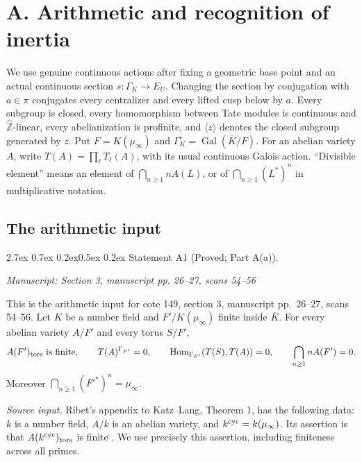 \documentclass[11pt,a4paper]{article}
\makeatletter
\newcommand{\passage}[1]{\par\smallskip\noindent\textit{Manuscript: #1}\par\smallskip}
\renewcommand\paragraph{\@startsection{paragraph}{4}{\z@}%
  {2.7ex \@plus 0.7ex \@minus 0.2ex}{0.5ex \@plus 0.2ex}%
  {\normalfont\normalsize\bfseries}}
\makeatother
\begin{document}
\section{A. Arithmetic and recognition of inertia}


We use genuine continuous actions after fixing a geometric base point and an actual continuous section $s:\Gamma_K\to E_U$. Changing the section by conjugation with $a\in\pi$ conjugates every centralizer and every lifted cusp below by $a$. Every subgroup is closed, every homomorphism between Tate modules is continuous and $\widehat{\mathbb Z}$-linear, every abelianization is profinite, and $\langle z\rangle$ denotes the closed subgroup generated by $z$. Put $F=K(\mu_\infty)$ and $\Gamma_K^\circ=\operatorname{Gal}(\overline K/F)$. For an abelian variety $A$, write $T(A)=\prod_\ell T_\ell(A)$, with its usual continuous Galois action. ``Divisible element'' means an element of $\bigcap_{n\geq1}nA(L)$, or of $\bigcap_{n\geq1}(L^*)^n$ in multiplicative notation.

\subsection{The arithmetic input}
\paragraph{Statement A1 (Proved; Part A(a)).}\label{res:A1}
\passage{Section 3, manuscript pp. 26–27, scans 54–56}

This is the arithmetic input for cote 149, section 3, manuscript pp.~26--27, scans 54--56.
Let $K$ be a number field and $F'/K(\mu_\infty)$ finite inside $\overline K$. For every abelian variety $A/F'$ and every torus $S/F'$,
\[
 A(F')_{\rm tors}\text{ is finite},\qquad T(A)^{\Gamma_{F'}}=0,
 \qquad\operatorname{Hom}_{\Gamma_{F'}}(T(S),T(A))=0,
 \qquad\bigcap_{n\geq1}nA(F')=0.
\]
Moreover $\bigcap_{n\geq1}(F'^*)^n=\mu_\infty$.

\emph{Source input.} Ribet's appendix to Katz--Lang, Theorem 1, has the following data: $k$ is a number field, $A/k$ is an abelian variety, and $k^{\rm cyc}=k(\mu_\infty)$. Its assertion is that $A(k^{\rm cyc})_{\rm tors}$ is finite \cite[Appendix, Theorem 1, p.~315]{Ribet1981}. We use precisely this assertion, including finiteness across all primes.
\end{document}

